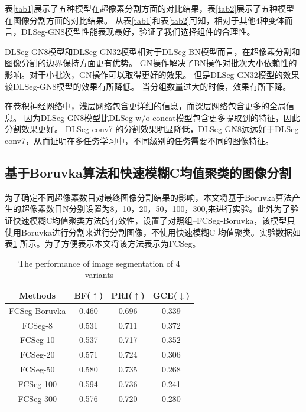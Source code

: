表\ref{tab1}展示了五种模型在超像素分割方面的对比结果，表\ref{tab2}展示了五种模型在图像分割方面的对比结果。
从表\ref{tab1}和表\ref{tab2}可知，相对于其他4种变体而言，DLSeg-GN8模型性能表现最好，验证了我们选择组件的合理性。

DLSeg-GN8模型和DLSeg-GN32模型相对于DLSeg-BN模型而言，在超像素分割和图像分割的边界保持方面更有优势。
GN操作解决了BN操作对批次大小依赖性的影响。对于小批次，GN操作可以取得更好的效果。
但是DLSeg-GN32模型的效果较DLSeg-GN8模型的效果有所降低。
当分组数量过大的时候，效果有所下降。

在卷积神经网络中，浅层网络包含更详细的信息，而深层网络包含更多的全局信息。
因为DLSeg-GN8模型比DLSeg-w/o-concat模型包含更多提取到的特征，因此分割效果更好。
DLSeg-conv7 的分割效果明显降低，DLSeg-GN8远远好于DLSeg-conv7，从而证明在多任务学习中，不同级别的任务需要不同的图像特征。

\subsection{基于Boruvka算法和快速模糊C均值聚类的图像分割}

为了确定不同超像素数目对最终图像分割结果的影响，本文将基于Boruvka算法产生的超像素数目N分别设置为8，10，20，50，100，300,来进行实验。此外为了验证快速模糊C均值聚类方法的有效性，设置了对照组--FCSeg-Boruvka，该模型只使用Boruvka进行分割来进行分割图像，不使用快速模糊C 均值聚类。实验数据如表\ref{tab3} 所示。为了方便表示本文将该方法表示为FCSeg。

\begin{table}[htbp]
\caption{The performance of image segmentation of 4 variants}
\label{tab3}
\vspace{0.5em}\centering\wuhao
\begin{tabular}{cccc}
\toprule[1.5pt]
Methods & BF($\uparrow$) & PRI($\uparrow$) & GCE($\downarrow$) \\
\midrule[1pt]
FCSeg-Boruvka   & 0.460 & 0.696 & 0.339 \\
FCSeg-8   & 0.531 & 0.711 & 0.372  \\
FCSeg-10   & 0.537 & 0.717 & 0.352 \\
FCSeg-20   & 0.571 & 0.724 & 0.306 \\
FCSeg-50  & 0.580 & 0.735 &  0.268 \\
FCSeg-100  & 0.594 & 0.736 &  0.241\\
FCSeg-300  & 0.576 & 0.720 &  0.280\\
\bottomrule[1.5pt]
\end{tabular}
\vspace{\baselineskip}
\end{table}


